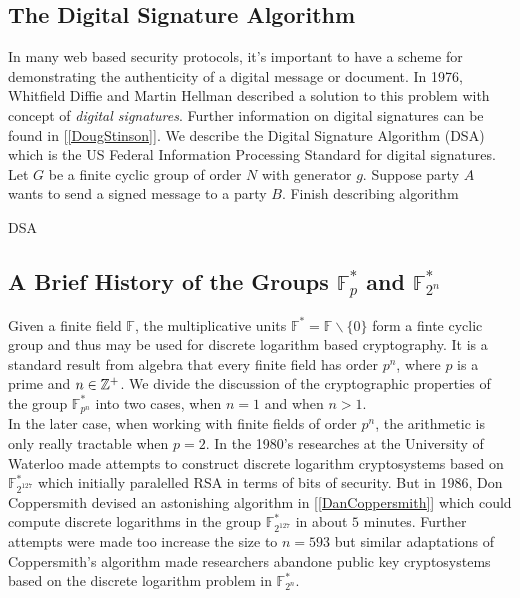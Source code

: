 \subsection{The Digital Signature Algorithm}

In many web based security protocols, it's important to have a scheme for demonstrating the authenticity of a digital message or document. In 1976, Whitfield Diffie and Martin Hellman described a solution to this problem with concept of \textit{digital signatures}. Further information on digital signatures can be found in [\ref{DougStinson}]. We describe the Digital Signature Algorithm (DSA) which is the US Federal Information Processing Standard for digital signatures. \\ 

Let $G$ be a finite cyclic group of order $N$ with generator $g$. Suppose party $A$ wants to send a signed message to a party $B$. {\color{blue}  Finish describing algorithm}


\begin{algorithm} 
	\caption{DSA }
	\begin{algorithmic}[1]
		\State
	\end{algorithmic} 
\end{algorithm} 


\subsection{A Brief History of the Groups $\mathbb{F}_p^*$ and $\mathbb{F}_{2^n}^*$}

Given a finite field $\mathbb{F}$, the multiplicative units $\mathbb{F}^* = \mathbb{F} \backslash \lbrace 0 \rbrace $ form a finte cyclic group and thus may be used for discrete logarithm based cryptography. It is a standard result from algebra that every finite field has order $p^n$, where $p$ is a prime and $n \in \mathbb{Z}^+$. We divide the discussion of the cryptographic properties of the group $\mathbb{F}_{p^n}^*$ into two cases, when $n = 1$ and when $n>1$. \\

In the later case, when working with finite fields of order $p^n$, the arithmetic is only really tractable when $p=2$. In the 1980's researches at the University of Waterloo made attempts to construct discrete logarithm cryptosystems based on $\mathbb{F}_{2^{127}}^*$ which initially paralelled RSA in terms of bits of security. But in 1986, Don Coppersmith devised an astonishing algorithm in [\ref{DanCoppersmith}] which could compute discrete logarithms in the group $\mathbb{F}_{2^{127}}^*$ in about $5$ minutes. Further attempts were made too increase the size to $n=593$ but similar adaptations of Coppersmith's algorithm made researchers abandone public key cryptosystems based on the discrete logarithm problem in $\mathbb{F}_{2^n}^*$. \\

